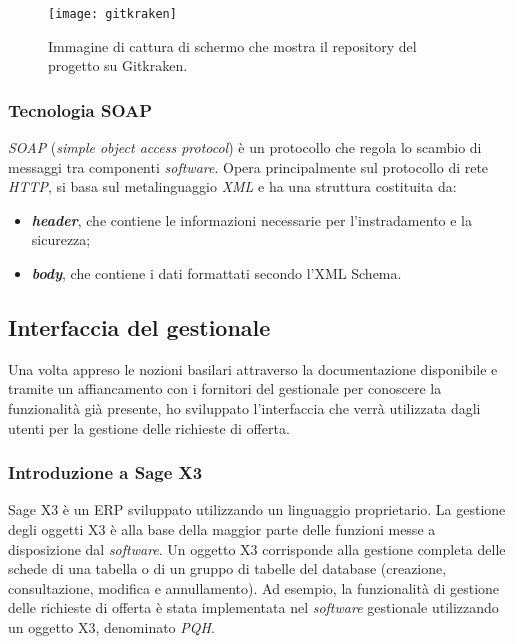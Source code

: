 \begin{figure}[htbp]
	\begin{center}
		\texttt{[image: gitkraken]}
		\caption{Immagine di cattura di schermo che mostra il repository del progetto su Gitkraken.}
	\end{center}
\end{figure}


\subsubsection{Tecnologia SOAP}
\textit{SOAP} (\textit{simple object access protocol}) è un protocollo che regola lo scambio di messaggi tra componenti \textit{software}. Opera principalmente sul protocollo di rete \textit{HTTP}, si basa sul metalinguaggio \textit{XML} e ha una struttura costituita da:
\begin{itemize}
	\item \textit{\textbf{header}}, che contiene le informazioni necessarie per l'instradamento e la sicurezza; 
	\item \textit{\textbf{body}}, che contiene i dati formattati secondo l'XML Schema.
\end{itemize}




\subsection{Interfaccia del gestionale}
Una volta appreso le nozioni basilari attraverso la documentazione disponibile e tramite un affiancamento con i fornitori del gestionale per conoscere la funzionalità già
presente, ho sviluppato l'interfaccia che verrà utilizzata dagli utenti per la gestione delle richieste di offerta.

\subsubsection{Introduzione a Sage X3}
Sage X3 è un ERP sviluppato utilizzando un linguaggio proprietario.
La gestione degli oggetti X3 è alla base della maggior parte delle funzioni messe a disposizione dal \textit{software}.
Un oggetto X3 corrisponde alla gestione completa delle schede di una tabella o di un gruppo di tabelle del database (creazione, consultazione, modifica e annullamento).
Ad esempio, la funzionalità di gestione delle richieste di offerta è stata implementata nel \textit{software} gestionale utilizzando un oggetto X3, denominato \textit{PQH}.

